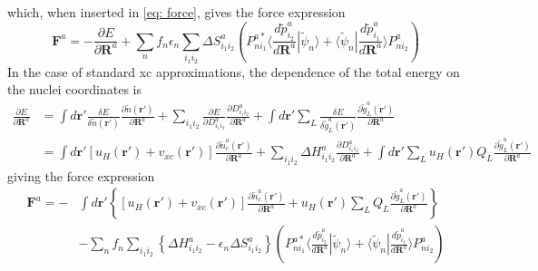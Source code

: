 \documentclass[a4paper]{article}
\newcommand{\f}[1]{\mathbf{#1}}
\newcommand{\s}[1]{\tilde{#1}}
\newcommand{\br}{\mathbf{r}}
\newcommand{\bR}{\mathbf{R}}
\newcommand{\braket}[2]{\langle #1 | #2 \rangle}
\begin{document}
%
which, when inserted in \ref{eq: force}, gives the force expression
%
\begin{equation}
  \f{F}^a = -\frac{\partial E}{\partial \bR^a} + \sum_n f_n \epsilon_n \sum_{i_1i_2}\Delta S^a_{i_1i_2}\left( P^{a*}_{ni_1}\braket{\frac{d \s{p}^a_{i_2}}{d\bR^a}}{\s{\psi}_n} + \braket{\s{\psi}_n}{\frac{d \s{p}^a_{i_1}}{d\bR^a}} P^a_{ni_2}\right)
\end{equation}
%
In the case of standard xc approximations, the dependence of the total
energy on the nuclei coordinates is
%
\begin{equation}
  \begin{split}
    \frac{\partial E}{\partial \bR^a} &= \int d\br' \frac{\delta E}{\delta \s{n}(\br')}\frac{\partial \s{n}(\br')}{\partial \bR^a} + \sum_{i_1i_2} \frac{\partial E}{\partial D^a_{i_1i_2}}\frac{\partial D^a_{i_1i_2}}{\partial \bR^a} + \int d\br' \sum_L \frac{\delta E}{\delta \s{g}^a_L(\br')}\frac{\partial \s{g}^a_L(\br')}{\partial \bR^a}\\
    &=\int d\br' [u_H(\br') + v_{xc}(\br')]\frac{\partial \s{n}^a_c(\br')}{\partial \bR^a} + \sum_{i_1i_2} \Delta H^a_{i_1i_2}\frac{\partial D^a_{i_1i_2}}{\partial \bR^a} + \int d\br' \sum_L u_H(\br')Q_L\frac{\partial \s{g}^a_L(\br')}{\partial \bR^a}
  \end{split}
\end{equation}
%
giving the force expression
%
\begin{equation}\label{eq: force no exx}
  \begin{split}
    \f{F}^a = - &\int d\br' \left\{ [u_H(\br') + v_{xc}(\br')]\frac{\partial \s{n}^a_c(\br')}{\partial \bR^a} + u_H(\br')\sum_L Q_L\frac{\partial \s{g}^a_L(\br')}{\partial \bR^a} \right\}\\
    &- \sum_n f_n \sum_{i_1i_2}\left\{\Delta H^a_{i_1i_2} - \epsilon_n\Delta S^a_{i_1i_2}\right\}\left( P^{a*}_{ni_1}\braket{\frac{d \s{p}^a_{i_2}}{d\bR^a}}{\s{\psi}_n} + \braket{\s{\psi}_n}{\frac{d \s{p}^a_{i_1}}{d\bR^a}} P^a_{ni_2}\right)
  \end{split}
\end{equation}
%
\end{document}
